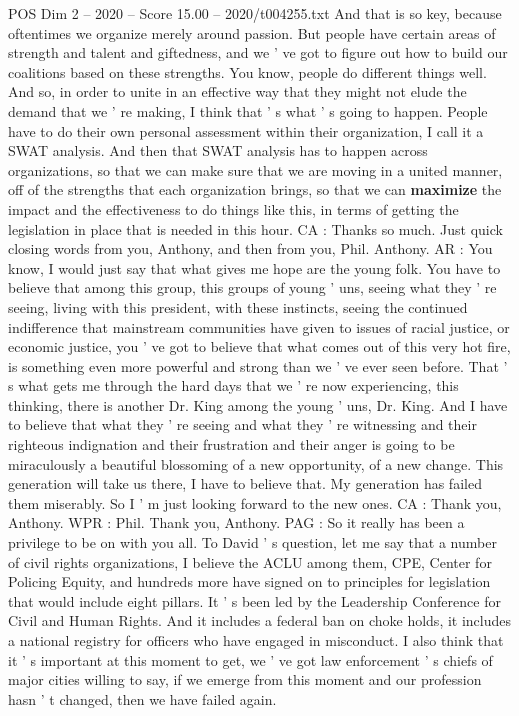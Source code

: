 \begin{textsample}{POS Dim 2 – 2020 – Score 15.00 – 2020/t004255.txt}
And that is so key, because oftentimes we organize merely around passion.
But people have certain areas of strength and talent and giftedness, and we ' ve got to figure out how to build our coalitions based on these strengths.
You know, people do different things well.
And so, in order to unite in an effective way that they might not elude the demand that we ' re making, I think that ' s what ' s going to happen.
People have to do their own personal assessment within their organization, I call it a SWAT analysis.
And then that SWAT analysis has to happen across organizations, so that we can make sure that we are moving in a united manner, off of the strengths that each organization brings, so that we can \textbf{maximize} the impact and the effectiveness to do things like this, in terms of getting the legislation in place that is needed in this hour.
CA : Thanks so much.
Just quick closing words from you, Anthony, and then from you, Phil.
Anthony.
AR : You know, I would just say that what gives me hope are the young folk.
You have to believe that among this group, this groups of young ' uns, seeing what they ' re seeing, living with this president, with these instincts, seeing the continued indifference that mainstream communities have given to issues of racial justice, or economic justice, you ' ve got to believe that what comes out of this very hot fire, is something even more powerful and strong than we ' ve ever seen before.
That ' s what gets me through the hard days that we ' re now experiencing, this thinking, there is another Dr.
King among the young ' uns, Dr.
King.
And I have to believe that what they ' re seeing and what they ' re witnessing and their righteous indignation and their frustration and their anger is going to be miraculously a beautiful blossoming of a new opportunity, of a new change.
This generation will take us there, I have to believe that.
My generation has failed them miserably.
So I ' m just looking forward to the new ones.
CA : Thank you, Anthony.
WPR : Phil.
Thank you, Anthony.
PAG : So it really has been a privilege to be on with you all.
To David ' s question, let me say that a number of civil rights organizations, I believe the ACLU among them, CPE, Center for Policing Equity, and hundreds more have signed on to principles for legislation that would include eight pillars.
It ' s been led by the Leadership Conference for Civil and Human Rights.
And it includes a federal ban on choke holds, it includes a national registry for officers who have engaged in misconduct.
I also think that it ' s important at this moment to get, we ' ve got law enforcement ' s chiefs of major cities willing to say, if we emerge from this moment and our profession hasn ' t changed, then we have failed again.

\end{textsample}
